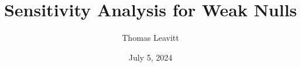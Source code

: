 \documentclass[table, xcolor = {dvipsnames}, 9pt]{beamer}
\title[]{Sensitivity Analysis for Weak Nulls} %
\author{Thomas Leavitt} %
\institute[] %
{ %
\medskip
\textit{} %
}
\date{July 5, 2024} %
\theoremstyle{plain}
\begin{document}
\begin{frame}
\titlepage %
\end{frame}


\end{document}
